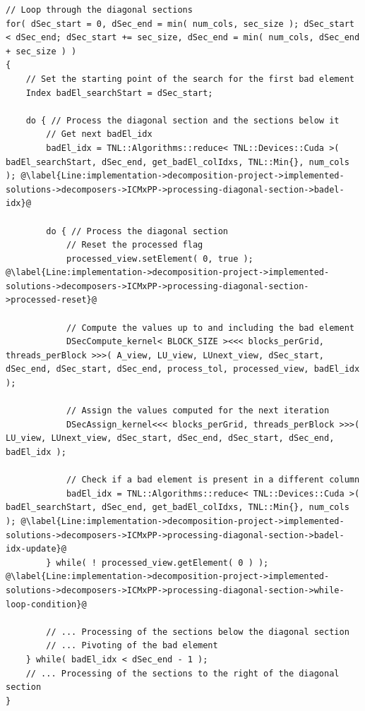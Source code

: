 \begin{lstlisting}
// Loop through the diagonal sections
for( dSec_start = 0, dSec_end = min( num_cols, sec_size ); dSec_start < dSec_end; dSec_start += sec_size, dSec_end = min( num_cols, dSec_end + sec_size ) )
{
	// Set the starting point of the search for the first bad element
	Index badEl_searchStart = dSec_start;
	
	do { // Process the diagonal section and the sections below it
		// Get next badEl_idx
		badEl_idx = TNL::Algorithms::reduce< TNL::Devices::Cuda >( badEl_searchStart, dSec_end, get_badEl_colIdxs, TNL::Min{}, num_cols ); @\label{Line:implementation->decomposition-project->implemented-solutions->decomposers->ICMxPP->processing-diagonal-section->badel-idx}@
		
		do { // Process the diagonal section
			// Reset the processed flag
			processed_view.setElement( 0, true ); @\label{Line:implementation->decomposition-project->implemented-solutions->decomposers->ICMxPP->processing-diagonal-section->processed-reset}@
			
			// Compute the values up to and including the bad element
			DSecCompute_kernel< BLOCK_SIZE ><<< blocks_perGrid, threads_perBlock >>>( A_view, LU_view, LUnext_view, dSec_start, dSec_end, dSec_start, dSec_end, process_tol, processed_view, badEl_idx );
			
			// Assign the values computed for the next iteration
			DSecAssign_kernel<<< blocks_perGrid, threads_perBlock >>>( LU_view, LUnext_view, dSec_start, dSec_end, dSec_start, dSec_end, badEl_idx );
			
			// Check if a bad element is present in a different column
			badEl_idx = TNL::Algorithms::reduce< TNL::Devices::Cuda >( badEl_searchStart, dSec_end, get_badEl_colIdxs, TNL::Min{}, num_cols ); @\label{Line:implementation->decomposition-project->implemented-solutions->decomposers->ICMxPP->processing-diagonal-section->badel-idx-update}@
		} while( ! processed_view.getElement( 0 ) ); @\label{Line:implementation->decomposition-project->implemented-solutions->decomposers->ICMxPP->processing-diagonal-section->while-loop-condition}@
		
		// ... Processing of the sections below the diagonal section
		// ... Pivoting of the bad element
	} while( badEl_idx < dSec_end - 1 );
	// ... Processing of the sections to the right of the diagonal section
}
\end{lstlisting}

